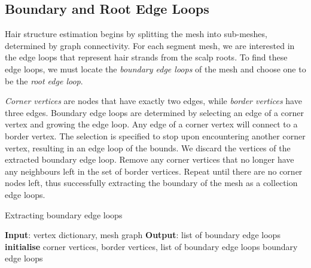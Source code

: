 \documentclass[ %
author={Dillon Keith Diep},
supervisor={Dr. Carl Henrik Ek},
degree={MEng},
title={ART-CG:},
subtitle={Assisted Real-time Content Generation of 3D Hair by Learning Manifolds},
type={Research},
year={2017} ]{dissertation}
\begin{document}
\subsection{Boundary and Root Edge Loops}
Hair structure estimation begins by splitting the mesh into sub-meshes, determined by graph connectivity. For each segment mesh, we are interested in the edge loops that represent hair strands from the scalp roots. To find these edge loops, we must locate the \textit{boundary edge loops} of the mesh and choose one to be the \textit{root edge loop}.

\textit{Corner vertices} are nodes that have exactly two edges, while \textit{border vertices} have three edges. Boundary edge loops are determined by selecting an edge of a corner vertex and growing the edge loop. Any edge of a corner vertex will connect to a border vertex. The selection is specified to stop upon encountering another corner vertex, resulting in an edge loop of the bounds. We discard the vertices of the extracted boundary edge loop. Remove any corner vertices that no longer have any neighbours left in the set of border vertices. Repeat until there are no corner nodes left, thus successfully extracting the boundary of the mesh as a collection edge loops.

\begin{algorithm}[!h]
	\caption{Extracting boundary edge loops}
	\algrule
	\textbf{Input}: vertex dictionary, mesh graph\;
	\textbf{Output}: list of boundary edge loops\;
	\algrule
	\textbf{initialise} corner vertices, border vertices, list of boundary edge loops\;
	\Return boundary edge loops
\end{algorithm}
\end{document}
